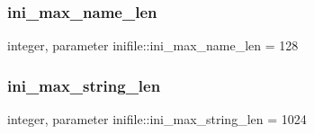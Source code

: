 \subsubsection{\texorpdfstring{ini\+\_\+max\+\_\+name\+\_\+len}{ini\_max\_name\_len}}
{\footnotesize\ttfamily integer, parameter inifile\+::ini\+\_\+max\+\_\+name\+\_\+len = 128}

\mbox{\label{namespaceinifile_a32faebf83b580d14b5af965dcb4eebfd}} 
\subsubsection{\texorpdfstring{ini\+\_\+max\+\_\+string\+\_\+len}{ini\_max\_string\_len}}
{\footnotesize\ttfamily integer, parameter inifile\+::ini\+\_\+max\+\_\+string\+\_\+len = 1024}

